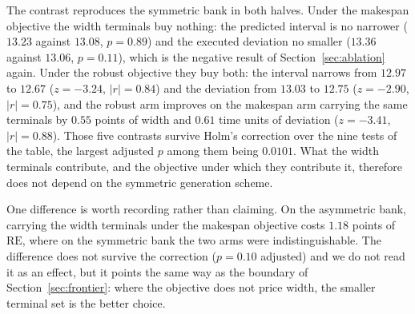 \documentclass[review,authoryear,11pt]{elsarticle}
\newcommand{\rev}[1]{\textcolor{revcolor}{#1}}
\newcommand{\RE}{\mathrm{RE}}
\begin{document}
\rev{The contrast reproduces the symmetric bank in both halves. Under
the makespan objective the width terminals buy nothing: the predicted
interval is no narrower ($13.23$ against $13.08$, $p=0.89$) and the
executed deviation no smaller ($13.36$ against $13.06$, $p=0.11$),
which is the negative result of Section~\ref{sec:ablation} again. Under
the robust objective they buy both: the interval narrows from $12.97$
to $12.67$ ($z=-3.24$, $|r|=0.84$) and the deviation from $13.03$ to
$12.75$ ($z=-2.90$, $|r|=0.75$), and the robust arm improves on the
makespan arm carrying the same terminals by $0.55$ points of width and
$0.61$ time units of deviation ($z=-3.41$, $|r|=0.88$). Those five
contrasts survive Holm's correction over the nine tests of the table,
the largest adjusted $p$ among them being $0.0101$. What the width
terminals contribute, and the objective under which they contribute it,
therefore does not depend on the symmetric generation scheme.}

\rev{One difference is worth recording rather than claiming. On the
asymmetric bank, carrying the width terminals under the makespan
objective costs $1.18$ points of $\RE$, where on the symmetric bank the
two arms were indistinguishable. The difference does not survive the
correction ($p=0.10$ adjusted) and we do not read it as an effect, but
it points the same way as the boundary of Section~\ref{sec:frontier}:
where the objective does not price width, the smaller terminal set is
the better choice.}
\end{document}
